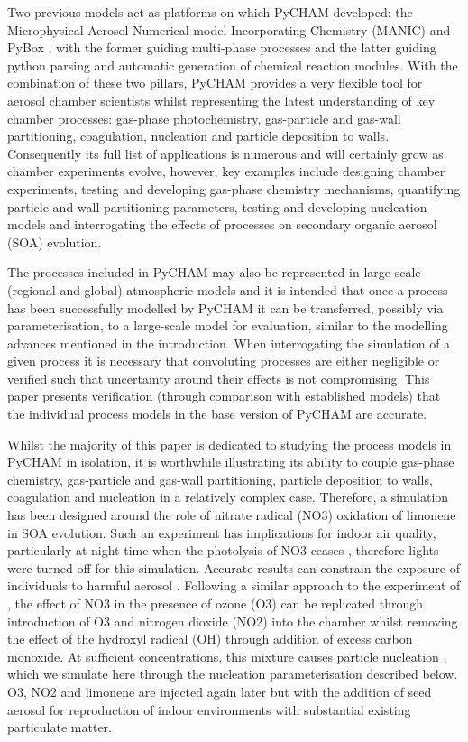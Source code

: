 \documentclass[gmd, manuscript]{copernicus}
\begin{document}
Two previous models act as platforms on which PyCHAM developed: the Microphysical Aerosol Numerical model Incorporating Chemistry (MANIC) \citep{Lowe2009} and PyBox \citep{Topping2018}, with the former guiding multi-phase processes and the latter guiding python parsing and automatic generation of chemical reaction modules.  With the combination of these two pillars, PyCHAM provides a very flexible tool for aerosol chamber scientists whilst representing the latest understanding of key chamber processes: gas-phase photochemistry, gas-particle and gas-wall partitioning, coagulation, nucleation and particle deposition to walls.  Consequently its full list of applications is numerous and will certainly grow as chamber experiments evolve, however, key examples include designing chamber experiments, testing and developing gas-phase chemistry mechanisms, quantifying particle and wall partitioning parameters, testing and developing nucleation models and interrogating the effects of processes on secondary organic aerosol (SOA) evolution.

The processes included in PyCHAM may also be represented in large-scale (regional and global) atmospheric models and it is intended that once a process has been successfully modelled by PyCHAM it can be transferred, possibly via parameterisation, to a large-scale model for evaluation, similar to the modelling advances mentioned in the introduction.  When interrogating the simulation of a given process it is necessary that convoluting processes are either negligible or verified such that uncertainty around their effects is not compromising.  This paper presents verification (through comparison with established models) that the individual process models in the base version of PyCHAM are accurate.

Whilst the majority of this paper is dedicated to studying the process models in PyCHAM in isolation, it is worthwhile illustrating its ability to couple gas-phase chemistry, gas-particle and gas-wall partitioning, particle deposition to walls, coagulation and nucleation in a relatively complex case.  Therefore, a simulation has been designed around the role of nitrate radical (NO3) oxidation of limonene in SOA evolution.  Such an experiment has implications for indoor air quality, particularly at night time when the photolysis of NO3 ceases \citep{Waring2015}, therefore lights were turned off for this simulation.  Accurate results can constrain the exposure of individuals to harmful aerosol \citep{Carslaw2019}.  Following a similar approach to the experiment of \citet{Fry2011}, the effect of NO3 in the presence of ozone (O3) can be replicated through introduction of O3 and nitrogen dioxide (NO2) into the chamber whilst removing the effect of the hydroxyl radical (OH) through addition of excess carbon monoxide.  At sufficient concentrations, this mixture causes particle nucleation \citep{Fry2011}, which we simulate here through the nucleation parameterisation described below.  O3, NO2 and limonene are injected again later but with the addition of seed aerosol for reproduction of indoor environments with substantial existing particulate matter.
\end{document}
